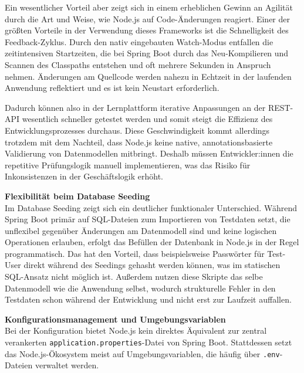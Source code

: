 Ein wesentlicher Vorteil aber zeigt sich in einem erheblichen Gewinn an Agilität durch die Art und Weise, wie Node.js auf Code-Änderungen reagiert. Einer der größten Vorteile in der Verwendung dieses Frameworks ist die Schnelligkeit des Feedback-Zyklus. Durch den nativ eingebauten Watch-Modus entfallen die zeitintensiven Startzeiten, die bei Spring Boot durch das Neu-Kompilieren und Scannen des Classpaths entstehen und oft mehrere Sekunden in Anspruch nehmen. Änderungen am Quellcode werden nahezu in Echtzeit in der laufenden Anwendung reflektiert und es ist kein Neustart erforderlich. \cite{NodeJsHotReload}

Dadurch können also in der Lernplattform iterative Anpassungen an der REST-API wesentlich schneller getestet werden und somit steigt die Effizienz des Entwicklungsprozesses durchaus. Diese Geschwindigkeit kommt allerdings trotzdem mit dem Nachteil, dass Node.js keine native, annotationsbasierte Validierung von Datenmodellen mitbringt. Deshalb müssen Entwickler:innen die repetitive Prüfungslogik manuell implementieren, was das Risiko für Inkonsistenzen in der Geschäftslogik erhöht.

\vspace{0.7cm}
\textbf{Flexibilität beim Database Seeding} \\
Im Database Seeding zeigt sich ein deutlicher funktionaler Unterschied. Während Spring Boot primär auf SQL-Dateien zum Importieren von Testdaten setzt, die unflexibel gegenüber Änderungen am Datenmodell sind und keine logischen Operationen erlauben, erfolgt das Befüllen der Datenbank in Node.js in der Regel programmatisch. Das hat den Vorteil, dass beispielsweise Passwörter für Test-User direkt während des Seedings gehasht werden können, was im statischen SQL-Ansatz nicht möglich ist. Außerdem nutzen diese Skripte das selbe Datenmodell wie die Anwendung selbst, wodurch strukturelle Fehler in den Testdaten schon während der Entwicklung und nicht erst zur Laufzeit auffallen. \cite{NodeJsDataBaseSeeding}

\vspace{0.7cm}
\textbf{Konfigurationsmanagement und Umgebungsvariablen} \\
Bei der Konfiguration bietet Node.js kein direktes Äquivalent zur zentral verankerten \texttt{application.properties}-Datei von Spring Boot. Stattdessen setzt das Node.js-Ökosystem meist auf Umgebungsvariablen, die häufig über \texttt{.env}-Dateien verwaltet werden. \cite{NodeJsConfigurationManagement}

